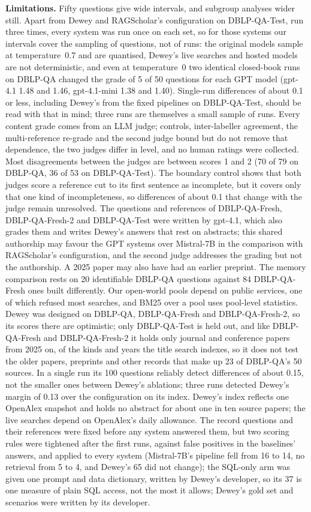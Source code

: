\documentclass[conference]{IEEEtran}
\newcommand{\dq}{DBLP-QA}
\newcommand{\fresh}{DBLP-QA-Fresh}
\newcommand{\freshb}{DBLP-QA-Fresh-2}
\newcommand{\test}{DBLP-QA-Test}
\begin{document}
\textbf{Limitations.} Fifty questions give wide intervals, and subgroup analyses wider still. Apart from
Dewey and RAGScholar's configuration on \test{}, run three times, every system was run once on each set,
so for those systems our intervals cover the sampling of questions, not of runs: the original
models sample at temperature~0.7 and are quantised, Dewey's live searches and hosted models are not
deterministic, and even at temperature~0 two identical closed-book runs on \dq{} changed the grade of 5 of
50 questions for each GPT model (gpt-4.1 1.48 and 1.46, gpt-4.1-mini 1.38 and 1.40). Single-run
differences of about 0.1 or less, including Dewey's from the fixed pipelines on \test{}, should be
read with that in mind; three runs are themselves a small sample of runs. Every content grade comes from an
LLM judge; controls, inter-labeller agreement, the multi-reference re-grade and the second judge bound but
do not remove that dependence, the two judges differ in level, and no human ratings were collected. Most
disagreements between the judges are between scores 1 and 2 (70 of 79 on \dq{}, 36 of 53 on \test{}).
The boundary control shows that both judges score a reference cut to its first sentence as incomplete,
but it covers only that one kind of incompleteness, so differences of about 0.1 that change with the
judge remain unresolved.
The questions and references of \fresh{}, \freshb{} and \test{} were written by gpt-4.1, which also grades
them and writes Dewey's answers that rest on abstracts; this shared authorship may favour the GPT systems
over Mistral-7B in the comparison with RAGScholar's configuration, and the second judge addresses the
grading but not the authorship. A 2025 paper may also have had an earlier preprint. The memory comparison rests on 20 identifiable
\dq{} questions against 84 \fresh{} ones built differently. Our open-world pools depend on public services,
one of which refused most searches, and BM25 over a pool uses pool-level statistics. Dewey was designed on
\dq{}, \fresh{} and \freshb{}, so its scores there are optimistic; only \test{} is held out, and like \fresh{} and
\freshb{} it holds only journal and conference papers from 2025 on, of the kinds and years the title
search indexes, so it does not test the older papers, preprints and other records that make up 23 of
\dq{}'s 50 sources. In a single run its 100 questions reliably detect differences of about 0.15, not the smaller ones between
Dewey's ablations; three runs detected Dewey's margin of 0.13 over the configuration on its index. Dewey's
index reflects one OpenAlex snapshot and holds no abstract for about one in ten source papers; the live
searches depend on OpenAlex's daily allowance. The record questions and their references were fixed before
any system answered them, but two scoring rules were tightened after the first runs, against false
positives in the baselines' answers, and applied to every system (Mistral-7B's pipeline fell from 16 to 14,
no retrieval from 5 to 4, and Dewey's 65 did not change); the SQL-only arm was given one prompt and data dictionary, written by Dewey's
developer, so its 37 is one measure of plain SQL access, not the most it allows; Dewey's gold set and
scenarios were written by its developer.
\end{document}
